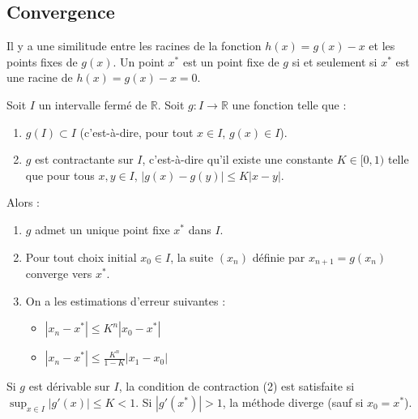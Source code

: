 \subsection{Convergence}
\label{ssec:iteration_convergence}
\begin{remark}
Il y a une similitude entre les racines de la fonction $h(x) = g(x)-x$ et les points fixes de $g(x)$. Un point $x^*$ est un point fixe de $g$ si et seulement si $x^*$ est une racine de $h(x) = g(x)-x=0$.
\end{remark}

\begin{proposition}
Soit $I$ un intervalle fermé de $\mathbb{R}$. Soit $g: I \to \mathbb{R}$ une fonction telle que :
\begin{enumerate}
    \item $g(I) \subset I$ (c'est-à-dire, pour tout $x \in I$, $g(x) \in I$).
    \item $g$ est contractante sur $I$, c'est-à-dire qu'il existe une constante $K \in [0, 1)$ telle que pour tous $x, y \in I$, $|g(x) - g(y)| \le K |x-y|$.
\end{enumerate}
Alors :
\begin{enumerate}
    \item $g$ admet un unique point fixe $x^*$ dans $I$.
    \item Pour tout choix initial $x_0 \in I$, la suite $(x_n)$ définie par $x_{n+1} = g(x_n)$ converge vers $x^*$.
    \item On a les estimations d'erreur suivantes :
    \begin{itemize}
        \item $|x_n - x^*| \le K^n |x_0 - x^*|$
        \item $|x_n - x^*| \le \frac{K^n}{1-K} |x_1 - x_0|$
    \end{itemize}
\end{enumerate}
Si $g$ est dérivable sur $I$, la condition de contraction (2) est satisfaite si $\sup_{x \in I} |g'(x)| \le K < 1$.
Si $|g'(x^*)| > 1$, la méthode diverge (sauf si $x_0 = x^*$).
\end{proposition}

